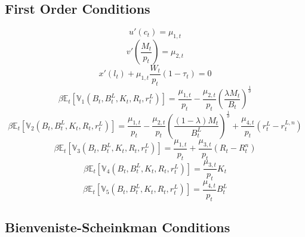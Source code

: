 \documentclass[11pt,a4paper,margin=1.5in]{article}
\begin{document}
\subsection{First Order Conditions}

\begin{equation}
	u'(c_t) = \mu_{1,t}
	\label{eq:HH_FOC_c}
\end{equation}
%
\begin{equation}
	v'\left(\frac{M_t}{p_t}\right) = \mu_{2,t}
	\label{eq:HH_FOC_M}
\end{equation}
%
\begin{equation}
	x'(l_t) + \mu_{1,t} \frac{W_t}{p_t} (1-\tau_t) = 0
	\label{eq:HH_FOC_l}
\end{equation}
%
\begin{equation}
	\beta\mathbb{E}_t\!\left[\mathbb{V}\!_1\left(B_{t}, B^L_{t}, K_{t}, R_{t}, r^L_{t}\right)\right] = \frac{\mu_{1,t}}{p_t} - \frac{\mu_{2,t}}{p_t}\left(\frac{\lambda M_t}{B_t}\right)^{\frac{1}{\sigma}}
	\label{eq:HH_FOC_B}
\end{equation}
%
\begin{equation}
	\beta\mathbb{E}_t\!\left[\mathbb{V}\!_2\left(B_{t}, B^L_{t}, K_{t}, R_{t}, r^L_{t}\right)\right] = \frac{\mu_{1,t}}{p_t} - \frac{\mu_{2,t}}{p_t}\left(\frac{(1-\lambda) M_t}{B^L_t}\right)^{\frac{1}{\sigma}} + \frac{\mu_{4,t}}{p_t}\left(r^L_t - r^{L,n}_t\right)
	\label{eq:HH_FOC_BL}
\end{equation}
%
\begin{equation}
	\beta\mathbb{E}_t\!\left[\mathbb{V}\!_3\left(B_{t}, B^L_{t}, K_{t}, R_{t}, r^L_{t}\right)\right] = \frac{\mu_{1,t}}{p_t} + \frac{\mu_{3,t}}{p_t}\left(R_t - R^{n}_t\right)
	\label{eq:HH_FOC_K}
\end{equation}
%
\begin{equation}
	\beta\mathbb{E}_t\!\left[\mathbb{V}\!_4\left(B_{t}, B^L_{t}, K_{t}, R_{t}, r^L_{t}\right)\right] = \frac{\mu_{3,t}}{p_t}K_t
	\label{eq:HH_FOC_R}
\end{equation}
%
\begin{equation}
	\beta\mathbb{E}_t\!\left[\mathbb{V}\!_5\left(B_{t}, B^L_{t}, K_{t}, R_{t}, r^L_{t}\right)\right] = \frac{\mu_{4,t}}{p_t}B^L_t
	\label{eq:HH_FOC_rL}
\end{equation}

\subsection{Bienveniste-Scheinkman Conditions}
\end{document}
